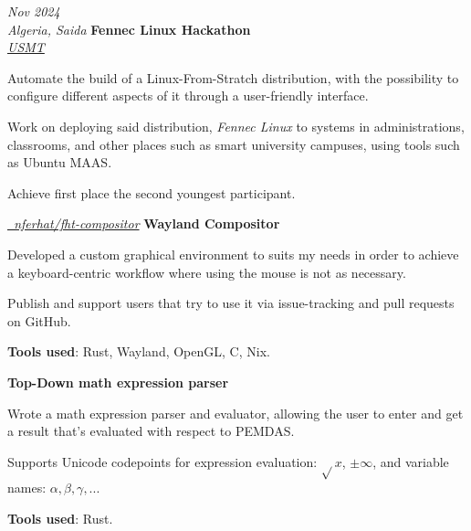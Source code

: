 \documentclass[10pt, letterpaper]{article}
\begin{document}
\begin{twocolentry} {\textit{Nov 2024} \\ \textit{Algeria, Saida}}
    \textbf{Fennec Linux Hackathon} \\
    \textit{\href{https://univ-saida.dz}{USMT}}
\end{twocolentry}
\begin{onecolentry}
    \begin{highlights}
    \item Automate the build of a Linux-From-Stratch distribution, with
        the possibility to configure different aspects of it through a
        user-friendly interface.
    \item Work on deploying said distribution, \textit{Fennec Linux} to systems
        in administrations, classrooms, and other places such as smart
        university campuses, using tools such as Ubuntu MAAS.
    \item Achieve first place the second youngest participant.
    \end{highlights}
\end{onecolentry}

\vspace{0.10 cm}

\begin{twocolentry}{\textit{\href{https://github.com/nferhat/fht-compositor}{\footnotesize\faGithub
    \  nferhat/fht-compositor}}}
    \textbf{Wayland Compositor}
\end{twocolentry}
\begin{onecolentry}
    \begin{highlights}
    \item Developed a custom graphical environment to suits my needs in order to
        achieve a keyboard-centric workflow where using the mouse is not as necessary.
    \item Publish and support users that try to use it via issue-tracking and pull requests on
        GitHub.
    \item \textbf{Tools used}: Rust, Wayland, OpenGL, C, Nix.
    \end{highlights}
\end{onecolentry}

\vspace{0.10 cm}

\begin{onecolentry}
    \textbf{Top-Down math expression parser}
\end{onecolentry}
\begin{onecolentry}
    \begin{highlights}
    \item Wrote a math expression parser and evaluator, allowing the user to enter and get a result
        that's evaluated with respect to PEMDAS.
    \item Supports Unicode codepoints for expression evaluation: $\sqrt{}x$, $\pm\infty$, and
        variable names: $\alpha, \beta, \gamma, ...$
    \item \textbf{Tools used}: Rust.
    \end{highlights}
\end{onecolentry}
\end{document}
